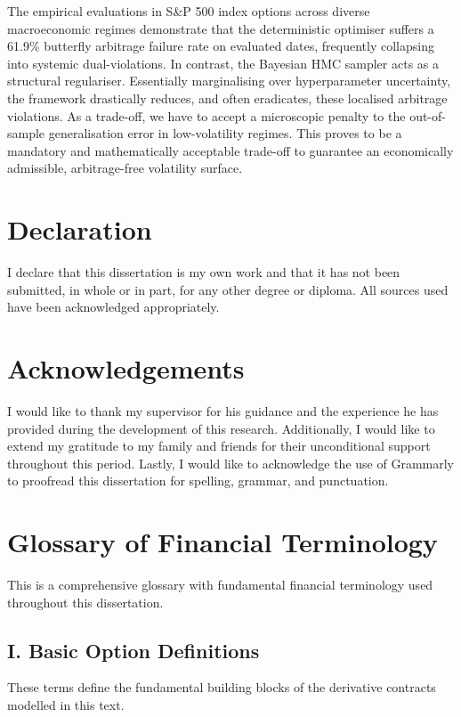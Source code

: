\documentclass[12pt,oneside]{report}
\theoremstyle{definition}
\theoremstyle{remark}
\begin{document}
The empirical evaluations in S\&P 500 index options across diverse macroeconomic regimes demonstrate that the deterministic optimiser suffers a 61.9\% butterfly arbitrage failure rate on evaluated dates, frequently collapsing into systemic dual-violations. In contrast, the Bayesian HMC sampler acts as a structural regulariser. Essentially marginalising over hyperparameter uncertainty, the framework drastically reduces, and often eradicates, these localised arbitrage violations. As a trade-off, we have to accept a microscopic penalty to the out-of-sample generalisation error in low-volatility regimes. This proves to be a mandatory and mathematically acceptable trade-off to guarantee an economically admissible, arbitrage-free volatility surface. 


\chapter*{Declaration}
I declare that this dissertation is my own work and that it has not been submitted, in whole or in part, for any other degree or diploma. All sources used have been acknowledged appropriately.

\chapter*{Acknowledgements}
I would like to thank my supervisor for his guidance and the experience he has provided during the development of this research.
Additionally, I would like to extend my gratitude to my family and friends for their unconditional support throughout this period.
Lastly, I would like to acknowledge the use of Grammarly to proofread this dissertation for spelling, grammar, and punctuation.

\newpage
\tableofcontents
\listoffigures
\listoftables

\clearpage
{}

\chapter*{Glossary of Financial Terminology}
\label{sec:glossary}

This is a comprehensive glossary with fundamental financial terminology used throughout this dissertation.

\section*{I. Basic Option Definitions}
{}
\label{sec:glossary_basic_option_definitions}
These terms define the fundamental building blocks of the derivative contracts modelled in this text.
\end{document}
